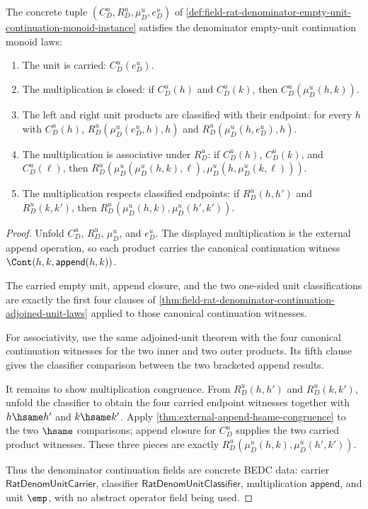 \begin{theorem}
\label{thm:field-rat-denominator-empty-unit-continuation-monoid-laws}
The concrete tuple
$(C_D^u,R_D^u,\mu_D^u,e_D^u)$ of
\autoref{def:field-rat-denominator-empty-unit-continuation-monoid-instance}
satisfies the denominator empty-unit continuation monoid laws:
\begin{enumerate}
  \item The unit is carried: $C_D^u(e_D^u)$.
  \item The multiplication is closed: if $C_D^u(h)$ and $C_D^u(k)$, then
  $C_D^u(\mu_D^u(h,k))$.
  \item The left and right unit products are classified with their endpoint:
  for every $h$ with $C_D^u(h)$,
  $R_D^u(\mu_D^u(e_D^u,h),h)$ and
  $R_D^u(\mu_D^u(h,e_D^u),h)$.
  \item The multiplication is associative under $R_D^u$: if
  $C_D^u(h)$, $C_D^u(k)$, and $C_D^u(\ell)$, then
  $R_D^u(\mu_D^u(\mu_D^u(h,k),\ell),
  \mu_D^u(h,\mu_D^u(k,\ell)))$.
  \item The multiplication respects classified endpoints: if $R_D^u(h,h')$
  and $R_D^u(k,k')$, then
  $R_D^u(\mu_D^u(h,k),\mu_D^u(h',k'))$.
\end{enumerate}
\end{theorem}
\begin{proof}
Unfold $C_D^u$, $R_D^u$, $\mu_D^u$, and $e_D^u$. The displayed multiplication
is the external append operation, so each product carries the canonical
continuation witness $\Cont(h,k,\mathsf{append}(h,k))$.

The carried empty unit, append closure, and the two one-sided unit
classifications are exactly the first four clauses of
\autoref{thm:field-rat-denominator-continuation-adjoined-unit-laws} applied to
those canonical continuation witnesses.

For associativity, use the same adjoined-unit theorem with the four canonical
continuation witnesses for the two inner and two outer products. Its fifth
clause gives the classifier comparison between the two bracketed append
results.

It remains to show multiplication congruence. From $R_D^u(h,h')$ and
$R_D^u(k,k')$, unfold the classifier to obtain the four carried endpoint
witnesses together with $h\hsame h'$ and $k\hsame k'$. Apply
\autoref{thm:external-append-hsame-congruence} to the two $\hsame$ comparisons;
append closure for $C_D^u$ supplies the two carried product witnesses. These
three pieces are exactly
$R_D^u(\mu_D^u(h,k),\mu_D^u(h',k'))$.

Thus the denominator continuation fields are concrete BEDC data: carrier
$\mathsf{RatDenomUnitCarrier}$, classifier
$\mathsf{RatDenomUnitClassifier}$, multiplication $\mathsf{append}$, and unit
$\emp$, with no abstract operator field being used.
\end{proof}

